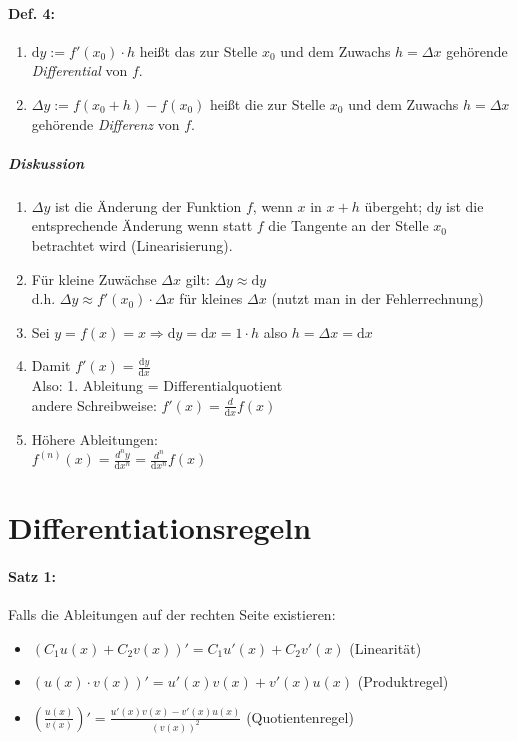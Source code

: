 \paragraph{Def. 4:} 
\begin{enumerate}[label=\alph*.)]
\item $\mathrm{d}y:= f'(x_0)\cdot h$ heißt das zur Stelle $x_0$ und dem Zuwachs $h=\Delta x$ gehörende \emph{Differential} von $f$.
\item $\Delta y := f(x_0+h)-f(x_0)$ heißt die zur Stelle $x_0$ und dem Zuwachs $h=\Delta x$ gehörende \emph{Differenz} von $f$.
\end{enumerate}
\subparagraph{Diskussion}
\begin{enumerate}
\item $\Delta y$ ist die Änderung der Funktion $f$, wenn $x$ in $x+h$ übergeht; $\mathrm{d}y$ ist die entsprechende Änderung wenn statt $f$ die Tangente an der Stelle $x_0$ betrachtet wird (Linearisierung).
\item Für kleine Zuwächse $\Delta x$ gilt: $\Delta y \approx \mathrm{d}y$\\
d.h. $\Delta y \approx f'(x_0)\cdot \Delta x$ für kleines $\Delta x$ (nutzt man in der Fehlerrechnung)
\item Sei $y=f(x)=x \Rightarrow \mathrm{d}y=\mathrm{d}x=1\cdot h$ also $\boxed{h=\Delta x = \mathrm{d}x}$
\item Damit $f'(x)=\frac{\mathrm{d}y}{\mathrm{d}x}$\\
Also: 1. Ableitung = Differentialquotient\\
andere Schreibweise: $f'(x)=\frac{d}{\mathrm{d}x}f(x)$
\item Höhere Ableitungen:\\
$f^{(n)}(x)=\frac{d^n y}{\mathrm{d}x^n}=\frac{d^n}{\mathrm{d}x^n}f(x)$
\end{enumerate}
\section{Differentiationsregeln}
\paragraph{Satz 1:} Falls die Ableitungen auf der rechten Seite existieren:
\begin{itemize}
\item $(C_1 u(x)+C_2 v(x))' = C_1 u'(x)+C_2 v'(x)$ (Linearität)
\item $(u(x) \cdot v(x))' = u'(x)v(x)+v'(x)u(x)$ (Produktregel)
\item $\left( \frac{u(x)}{v(x)}\right)' = \frac{u'(x)v(x)-v'(x)u(x)}{(v(x))^2}$ (Quotientenregel)
\end{itemize}

